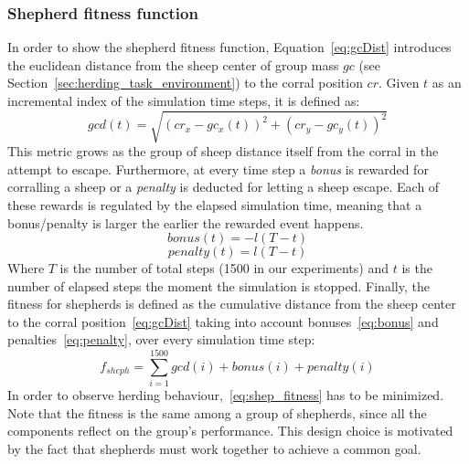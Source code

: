 \documentclass[conference]{IEEEtran}
\begin{document}
\subsubsection{Shepherd fitness function}
In order to show the shepherd fitness function, Equation~\eqref{eq:gcDist} introduces the euclidean distance from the sheep center of group mass $gc$ (see Section~\ref{sec:herding_task_environment}) to the corral position $cr$.
Given $t$ as an incremental index of the simulation time steps, it is defined as:
\begin{equation} \label{eq:gcDist}
gcd(t) = \sqrt{(cr_x - gc_x(t))^2 + (cr_y - gc_y(t))^2}
\end{equation}
This metric grows as the group of sheep distance itself from the corral in the attempt to escape.
Furthermore, at every time step a \textit{bonus} is rewarded for corralling a sheep or a \textit{penalty} is deducted for letting a sheep escape. 
Each of these rewards is regulated by the elapsed simulation time, meaning that a bonus/penalty is larger the earlier the rewarded event happens.
\begin{equation} \label{eq:bonus}
bonus(t) = - l (T - t)
\end{equation}
\begin{equation} \label{eq:penalty}
penalty(t) = l (T - t)
\end{equation}
Where $T$ is the number of total steps (1500 in our experiments) and $t$ is the number of elapsed steps the moment the simulation is stopped.
Finally, the fitness for shepherds is defined as the cumulative distance from the sheep center to the corral position~\eqref{eq:gcDist} taking into account bonuses~\eqref{eq:bonus} and penalties~\eqref{eq:penalty}, over every simulation time step:
\begin{equation} \label{eq:shep_fitness}
f_{sheph} = \sum_{i=1}^{1500} gcd(i)	+ bonus(i) + penalty(i)
\end{equation}
In order to observe herding behaviour,~\eqref{eq:shep_fitness} has to be minimized.
Note that the fitness is the same among a group of shepherds, since all the components reflect on the group's performance. 
This design choice is motivated by the fact that shepherds must work together to achieve a common goal. 

\vspace{0.5em}
\end{document}
